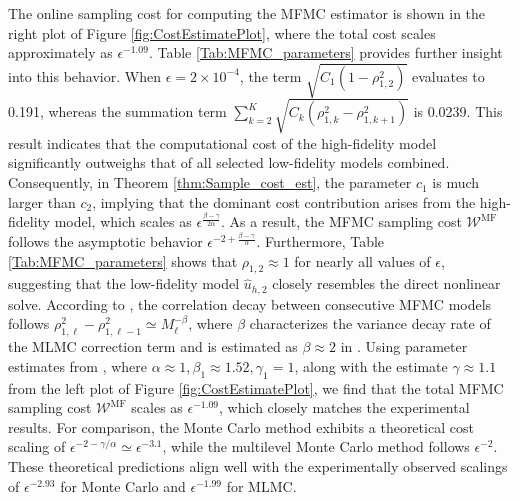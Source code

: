 The online sampling cost for computing the MFMC estimator is shown in the right plot of Figure \ref{fig:CostEstimatePlot}, where the total cost scales approximately as $\epsilon^{-1.09}$. Table \ref{Tab:MFMC_parameters} provides further insight into this behavior. When $\epsilon=2\times 10^{-4}$, the term $\sqrt{C_1(1-\rho_{1,2}^2)}$ evaluates to 0.191, whereas the summation term $\sum_{k=2}^K\sqrt{C_k(\rho_{1,k}^2-\rho_{1,k+1}^2)}$ is 0.0239. This result indicates that the computational cost of the high-fidelity model significantly outweighs that of all selected low-fidelity models combined. Consequently, in Theorem \ref{thm:Sample_cost_est}, the parameter $c_1$ is much larger than $c_2$,  implying that the dominant cost contribution arises from the high-fidelity model, which scales as $\epsilon^{\frac{\beta-\gamma}{2\alpha}}$. As a result, the MFMC sampling cost $\mathcal{W}^{\text{MF}}$ follows the asymptotic behavior $\epsilon^{-2+\frac{\beta-\gamma}{\alpha}}$. Furthermore, Table \ref{Tab:MFMC_parameters} shows that $\rho_{1,2}\approx 1$ for nearly all values of $\epsilon$, suggesting that the low-fidelity model $\widehat u_{h,2}$ closely resembles the direct nonlinear solve. According to \cite[Lemma 2]{PeGuWi:2018}, the correlation decay between consecutive MFMC models follows $\rho_{1,\ell}^2 - \rho_{1,\ell-1}^2\simeq M_\ell^{-\beta}$, where $\beta$ characterizes the variance decay rate of the MLMC correction term and is estimated as $\beta\approx 2$ in \cite{ElLiSa:2023}. Using parameter estimates from \cite{ElLiSa:2023, ElLiSa:2025}, where $\alpha\approx 1, \beta_1\approx 1.52, \gamma_1=1$, along with the estimate $\gamma\approx 1.1$ from the left plot of Figure \ref{fig:CostEstimatePlot}, we find that the total MFMC sampling cost $\mathcal{W}^{\text{MF}}$ scales as $\epsilon^{-1.09}$, which closely matches the experimental results. For comparison, the Monte Carlo method exhibits a theoretical cost scaling of $\epsilon^{-2-\gamma/\alpha}\simeq \epsilon^{-3.1}$, while the multilevel Monte Carlo method follows $\epsilon^{-2}$. These theoretical predictions align well with the experimentally observed scalings of $\epsilon^{-2.93}$ for Monte Carlo and $\epsilon^{-1.99}$ for MLMC.

